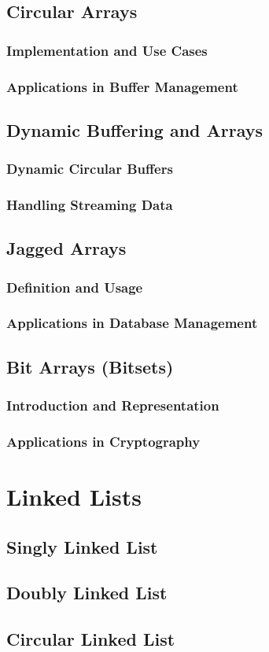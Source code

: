 \documentclass{book}
\begin{document}
	\section{Circular Arrays}
	\subsection{Implementation and Use Cases}
	\subsection{Applications in Buffer Management}
	
	\section{Dynamic Buffering and Arrays}
	\subsection{Dynamic Circular Buffers}
	\subsection{Handling Streaming Data}
	
	\section{Jagged Arrays}
	\subsection{Definition and Usage}
	\subsection{Applications in Database Management}
	
	\section{Bit Arrays (Bitsets)}
	\subsection{Introduction and Representation}
	\subsection{Applications in Cryptography}
	
	\chapter{Linked Lists}
	\section{Singly Linked List}
	\section{Doubly Linked List}
	\section{Circular Linked List}
	
\end{document}
